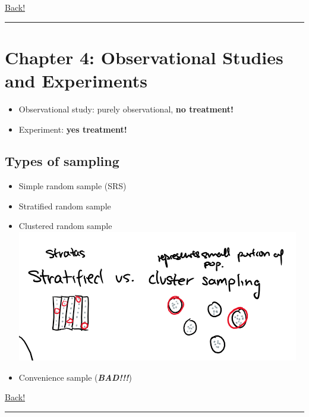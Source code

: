 \documentclass[main]{subfiles}
\begin{document}
\noindent\hyperlink{toc}{Back!}
\newline\hrule

\section{Chapter 4: Observational Studies and Experiments}
\begin{itemize}
    \item Observational study: purely observational, \textbf{no treatment!}
    \item Experiment: \textbf{yes treatment!}
\end{itemize}

\subsection{Types of sampling}
\begin{itemize}
    \item Simple random sample (SRS)
    \item Stratified random sample
    \item Clustered random sample
        \subitem \includegraphics[scale=0.8]{stratifiedcluster_sampling}
    \item Convenience sample (\textbf{\textit{BAD!!!}})
\end{itemize}

\noindent\hyperlink{toc}{Back!}
\newline\hrule
\end{document}
